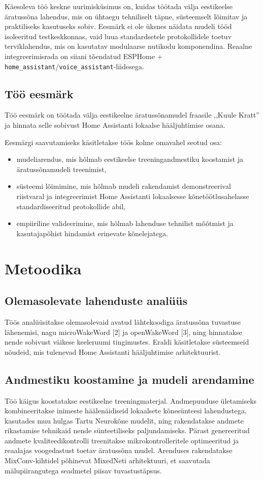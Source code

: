 \documentclass[12pt]{report}
\begin{document}
Käesoleva töö keskne uurimisküsimus on, kuidas töötada välja eestikeelse äratussõna lahendus, mis on ühtaegu tehniliselt täpne, süsteemselt lõimitav ja praktiliseks kasutuseks sobiv. Eesmärk ei ole üksnes näidata mudeli tööd isoleeritud testkeskkonnas, vaid luua standardsetele protokollidele toetuv terviklahendus, mis on kasutatav modulaarse nutikodu komponendina. Reaalne integreerimisrada on siiani tõendatud ESPHome + \texttt{home\_assistant}/\texttt{voice\_assistant}-liidesega.

\section{Töö eesmärk}
Töö eesmärk on töötada välja eestikeelne äratussõnamudel fraasile ,,Kuule Kratt'' ja hinnata selle sobivust Home Assistanti lokaalse hääljuhtimise osana.

Eesmärgi saavutamiseks käsitletakse töös kolme omavahel seotud osa:
\begin{itemize}
    \item mudeliarendus, mis hõlmab eestikeelse treeningandmestiku koostamist ja äratussõnamudeli treenimist,
    \item süsteemi lõimimine, mis hõlmab mudeli rakendamist demonstreerival riistvaral ja integreerimist Home Assistanti lokaalsesse kõnetöötlusahelasse standardiseeritud protokollide abil,
    \item empiiriline valideerimine, mis hõlmab lahenduse tehnilist mõõtmist ja kasutajapõhist hindamist erinevate kõnelejatega.
\end{itemize}

\chapter{Metoodika}

\section{Olemasolevate lahenduste analüüs}
Töös analüüsitakse olemasolevaid avatud lähtekoodiga äratussõna tuvastuse lähenemisi, nagu microWakeWord [2] ja openWakeWord [3], ning hinnatakse nende sobivust väikese keeleruumi tingimustes. Eraldi käsitletakse süsteemseid nõudeid, mis tulenevad Home Assistanti hääljuhtimise arhitektuurist.

\section{Andmestiku koostamine ja mudeli arendamine}
Töö käigus koostatakse eestikeelne treeningmaterjal. Andmepuuduse ületamiseks kombineeritakse inimeste häälenäidiseid lokaalsete kõnesünteesi lahendustega, kasutades muu hulgas Tartu Neurokõne mudelit, ning rakendatakse andmete rikastamise tehnikaid nende sünteetiliseks paljundamiseks. Pärast genereeritud andmete kvaliteedikontrolli treenitakse mikrokontrolleritele optimeeritud ja reaalajas voogedastust toetav äratussõna mudel. Arenduses rakendatakse MixConv-kihtidel põhinevat MixedNeti arhitektuuri, et saavutada mälupiirangutega seadmetel piisav tuvastustäpsus.
\end{document}
